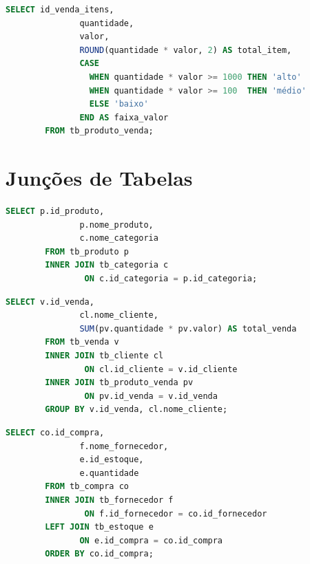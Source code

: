 \documentclass[
12pt,
a4paper,
semrecuonosumario,
sumario = abnt-6027-2012]{report}
\begin{document}
    \begin{lstlisting}[language=SQL,caption={SELECT -- Numérica + condicional: total por item e classificação}]
        SELECT id_venda_itens,
               quantidade,
               valor,
               ROUND(quantidade * valor, 2) AS total_item,
               CASE
                 WHEN quantidade * valor >= 1000 THEN 'alto'
                 WHEN quantidade * valor >= 100  THEN 'médio'
                 ELSE 'baixo'
               END AS faixa_valor
        FROM tb_produto_venda;
    \end{lstlisting}


    \section{Junções de Tabelas}


    \begin{lstlisting}[language=SQL,caption={SELECT -- INNER JOIN: produto e sua categoria}]
        SELECT p.id_produto,
               p.nome_produto,
               c.nome_categoria
        FROM tb_produto p
        INNER JOIN tb_categoria c
                ON c.id_categoria = p.id_categoria;
    \end{lstlisting}

    \begin{lstlisting}[language=SQL,caption={SELECT -- INNER JOIN em cadeia: venda com cliente e total}]
        SELECT v.id_venda,
               cl.nome_cliente,
               SUM(pv.quantidade * pv.valor) AS total_venda
        FROM tb_venda v
        INNER JOIN tb_cliente cl
                ON cl.id_cliente = v.id_cliente
        INNER JOIN tb_produto_venda pv
                ON pv.id_venda = v.id_venda
        GROUP BY v.id_venda, cl.nome_cliente;
    \end{lstlisting}

    \begin{lstlisting}[language=SQL,caption={SELECT -- LEFT JOIN: compras com (ou sem) itens de estoque}]
        SELECT co.id_compra,
               f.nome_fornecedor,
               e.id_estoque,
               e.quantidade
        FROM tb_compra co
        INNER JOIN tb_fornecedor f
                ON f.id_fornecedor = co.id_fornecedor
        LEFT JOIN tb_estoque e
               ON e.id_compra = co.id_compra
        ORDER BY co.id_compra;
    \end{lstlisting}
\end{document}
